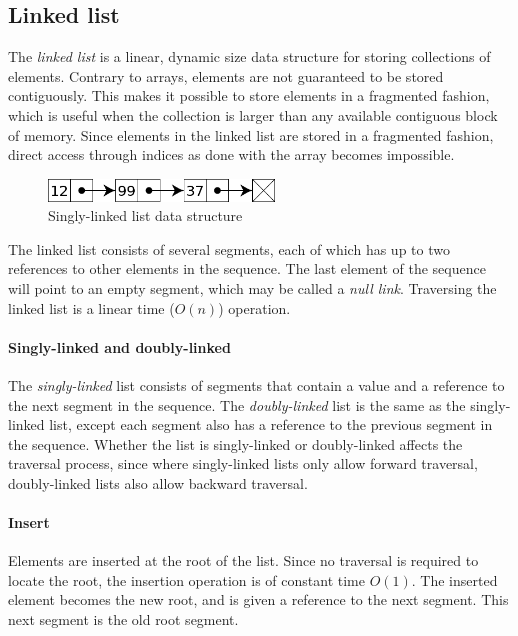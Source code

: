 \documentclass{article}
\begin{document}
{\subsection{Linked list}
The {\em linked list} is a linear, dynamic size data structure for storing collections of elements. Contrary to arrays,
elements are not guaranteed to be stored contiguously. This makes it possible to store elements in a fragmented fashion,
which is useful when the collection is larger than any available contiguous block of memory. Since elements in the linked
list are stored in a fragmented fashion, direct access through indices as done with the array becomes impossible.

\begin{figure}[H]
  \centering
  \includegraphics[width=6cm]{linked_list}
  \caption{Singly-linked list data structure}
\end{figure}

The linked list consists of several segments, each of which has up to two references to other
elements in the sequence. The last element of the sequence will point to an empty segment,
which may be called a {\em null link}. Traversing the linked list is a linear time (\(O(n)\)) operation.

\paragraph{Singly-linked and doubly-linked}
The {\em singly-linked} list consists of segments that contain a value and a reference to the next
segment in the sequence. The {\em doubly-linked} list is the same as the singly-linked list,
except each segment also has a reference to the previous segment in the sequence.
Whether the list is singly-linked or doubly-linked affects the traversal process,
since where singly-linked lists only allow forward traversal, doubly-linked lists also allow backward traversal.

\paragraph{Insert}
Elements are inserted at the root of the list. Since no traversal is required to locate the root,
the insertion operation is of constant time \(O(1)\). The inserted element becomes the new root,
and is given a reference to the next segment. This next segment is the old root segment.

}
\end{document}
